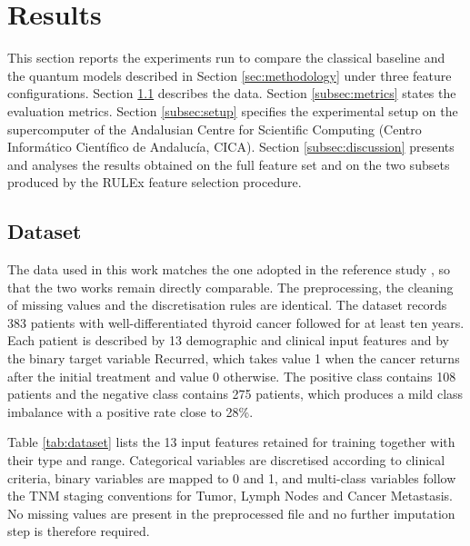
\section{Results}
\label{sec:results}

This section reports the experiments run to compare the classical baseline and the quantum models described in Section \ref{sec:methodology} under three feature configurations. Section \ref{subsec:dataset} describes the data. Section \ref{subsec:metrics} states the evaluation metrics. Section \ref{subsec:setup} specifies the experimental setup on the supercomputer of the Andalusian Centre for Scientific Computing (Centro Informático Científico de Andalucía, CICA). Section \ref{subsec:discussion} presents and analyses the results obtained on the full feature set and on the two subsets produced by the RULEx feature selection procedure.

\subsection{Dataset}
\label{subsec:dataset}

The data used in this work matches the one adopted in the reference study \cite{PaiQuantumXaiTiroides}, so that the two works remain directly comparable. The preprocessing, the cleaning of missing values and the discretisation rules are identical. The dataset records 383 patients with well-differentiated thyroid cancer followed for at least ten years. Each patient is described by 13 demographic and clinical input features and by the binary target variable Recurred, which takes value 1 when the cancer returns after the initial treatment and value 0 otherwise. The positive class contains 108 patients and the negative class contains 275 patients, which produces a mild class imbalance with a positive rate close to 28\%.

Table \ref{tab:dataset} lists the 13 input features retained for training together with their type and range. Categorical variables are discretised according to clinical criteria, binary variables are mapped to 0 and 1, and multi-class variables follow the TNM staging conventions for Tumor, Lymph Nodes and Cancer Metastasis. No missing values are present in the preprocessed file and no further imputation step is therefore required.

